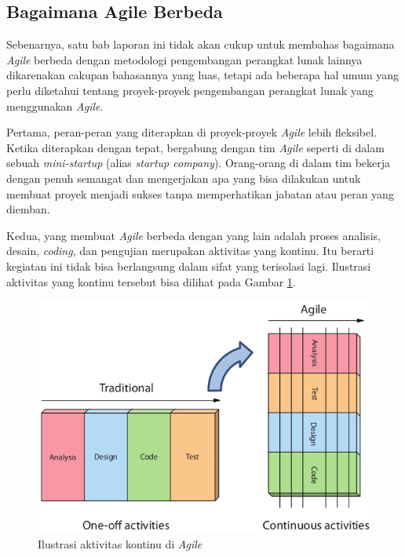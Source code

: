 \documentclass[a4paper, 12pt, oneside]{report}
\begin{document}
\subsection{Bagaimana Agile Berbeda}
\onehalfspacing Sebenarnya, satu bab laporan ini tidak akan cukup untuk membahas bagaimana \textit{Agile} berbeda dengan metodologi pengembangan perangkat lunak lainnya dikarenakan cakupan bahasannya yang luas, tetapi ada beberapa hal umum yang perlu diketahui tentang proyek-proyek pengembangan perangkat lunak yang menggunakan \textit{Agile}.

\onehalfspacing Pertama, peran-peran yang diterapkan di proyek-proyek \textit{Agile} lebih fleksibel. Ketika diterapkan dengan tepat, bergabung dengan tim \textit{Agile} seperti di dalam sebuah \textit{mini-startup} (alias \textit{startup company}). Orang-orang di dalam tim bekerja dengan penuh semangat dan mengerjakan apa yang bisa dilakukan untuk membuat proyek menjadi sukses tanpa memperhatikan jabatan atau peran yang diemban.

\newpage
\onehalfspacing Kedua, yang membuat \textit{Agile} berbeda dengan yang lain adalah proses analisis, desain, \textit{coding}, dan pengujian merupakan aktivitas yang kontinu. Itu berarti kegiatan ini tidak bisa berlangsung dalam sifat yang terisolasi lagi. Ilustrasi aktivitas yang kontinu tersebut bisa dilihat pada Gambar \ref{agile-process}.

\begin{figure}[htp]
\centering
\includegraphics[scale=0.60]{images/agile-process.png}
\caption{Ilustrasi aktivitas kontinu di \textit{Agile} \cite{agile-samurai}}
\label{agile-process}
\end{figure}
\end{document}

